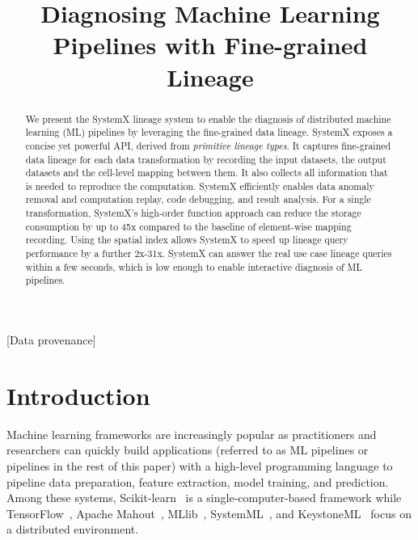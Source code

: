 \documentclass{sig-alternate}
\begin{document}
\title{Diagnosing Machine Learning Pipelines with Fine-grained Lineage}


\maketitle

\begin{abstract}
We present the SystemX lineage system to enable the diagnosis of distributed machine learning (ML) pipelines by leveraging the fine-grained
data lineage.  
SystemX exposes a concise yet powerful API, derived from \emph{primitive lineage types}. 
It captures fine-grained data lineage for each  data transformation by recording the input datasets, the output datasets and the cell-level mapping between them. 
It also collects all information that is needed to reproduce the computation.
SystemX efficiently enables data anomaly removal and computation replay, code debugging, and result analysis.
For a single transformation, SystemX's high-order function approach can reduce the storage consumption by up to 
45x compared to the baseline of element-wise mapping recording.
Using the spatial index allows SystemX to speed up lineage query performance by a further 2x-31x. 
SystemX can answer the real use case lineage queries within a few seconds, 
which is low enough to enable interactive diagnosis of ML pipelines.
\end{abstract}

[Data provenance]

\section{Introduction}
Machine learning frameworks are increasingly popular as practitioners and researchers can quickly
build applications (referred to as ML pipelines or pipelines in the rest of this paper) with a high-level 
programming language to pipeline data preparation, feature extraction, model training, and prediction. 
Among these systems, Scikit-learn~\cite{pedregosa2011scikit}
is a single-computer-based framework while TensorFlow~\cite{tensorflow15}, Apache Mahout~\cite{owen2011mahout}, MLlib~\cite{meng2015mllib}, 
SystemML~\cite{ghoting11systemml}, and KeystoneML~\cite{sparks15} focus on a distributed environment.
\end{document}
